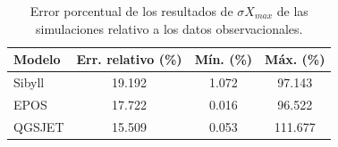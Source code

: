 \begin{table}[h]
\centering
\caption{Error porcentual de los resultados de $\sigma X_{max}$ de las simulaciones relativo a los datos observacionales.}
\begin{tabular}{l|ccc}
\hline
Modelo & Err. relativo (\%) & Mín. (\%) & Máx. (\%) \\ \hline
Sibyll & 19.192             & 1.072     & 97.143    \\ \hline
EPOS   & 17.722             & 0.016     & 96.522    \\ \hline
QGSJET & 15.509             & 0.053     & 111.677   \\ \hline
\end{tabular}
\end{table}

\singlespacing